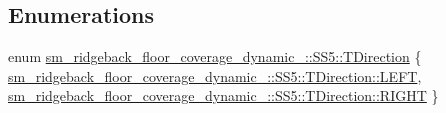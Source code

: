 \subsection*{Enumerations}
\begin{DoxyCompactItemize}
\item 
enum \hyperlink{namespacesm__ridgeback__floor__coverage__dynamic__1_1_1SS5_ac4b517bcfa16bb73b577c12b354754e5}{sm\+\_\+ridgeback\+\_\+floor\+\_\+coverage\+\_\+dynamic\+\_\+::\+S\+S5\+::\+T\+Direction} \{ \hyperlink{namespacesm__ridgeback__floor__coverage__dynamic__1_1_1SS5_ac4b517bcfa16bb73b577c12b354754e5a684d325a7303f52e64011467ff5c5758}{sm\+\_\+ridgeback\+\_\+floor\+\_\+coverage\+\_\+dynamic\+\_\+::\+S\+S5\+::\+T\+Direction\+::\+L\+E\+FT}, 
\hyperlink{namespacesm__ridgeback__floor__coverage__dynamic__1_1_1SS5_ac4b517bcfa16bb73b577c12b354754e5a21507b40c80068eda19865706fdc2403}{sm\+\_\+ridgeback\+\_\+floor\+\_\+coverage\+\_\+dynamic\+\_\+::\+S\+S5\+::\+T\+Direction\+::\+R\+I\+G\+HT}
 \}
\end{DoxyCompactItemize}
